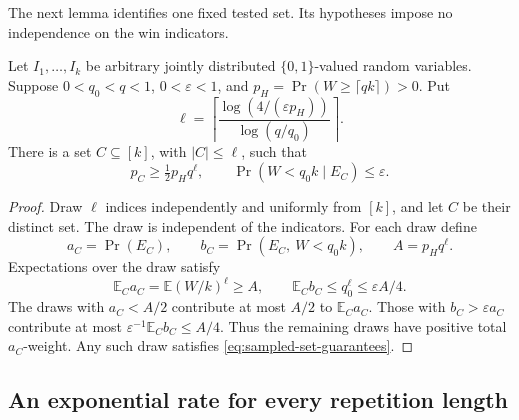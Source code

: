 The next lemma identifies one fixed tested set. Its hypotheses impose no
independence on the win indicators.
\begin{lemma}\label{lem:tail-sampling}
Let $I_1,\ldots,I_k$ be arbitrary jointly distributed $\{0,1\}$-valued
random variables. Suppose $0<q_0<q<1$, $0<\varepsilon<1$, and
$p_H=\Pr(W\ge\lceil qk\rceil)>0$. Put
\[
 \ell=\left\lceil
 \frac{\log(4/(\varepsilon p_H))}{\log(q/q_0)}
 \right\rceil.
\]
There is a set $C\subseteq[k]$, with $|C|\le\ell$, such that
\begin{equation}\label{eq:sampled-set-guarantees}
 p_C\ge\tfrac12p_Hq^\ell,
 \qquad \Pr(W<q_0k\mid E_C)\le\varepsilon.
\end{equation}
\end{lemma}
\begin{proof}
Draw $\ell$ indices independently and uniformly from $[k]$, and let $C$ be
their distinct set. The draw is independent of the indicators. For each
draw define
\[
 a_C=\Pr(E_C),\qquad b_C=\Pr(E_C,\ W<q_0k),
 \qquad A=p_Hq^\ell.
\]
Expectations over the draw satisfy
\[
 \mathbb E_C a_C=\mathbb E(W/k)^\ell\ge A,
 \qquad
 \mathbb E_C b_C\le q_0^\ell\le\varepsilon A/4.
\]
The draws with $a_C<A/2$ contribute at most $A/2$ to
$\mathbb E_C a_C$. Those with $b_C>\varepsilon a_C$ contribute at most
$\varepsilon^{-1}\mathbb E_C b_C\le A/4$. Thus the remaining draws have
positive total $a_C$-weight. Any such draw satisfies
\eqref{eq:sampled-set-guarantees}.
\end{proof}

\subsection{An exponential rate for every repetition length}

